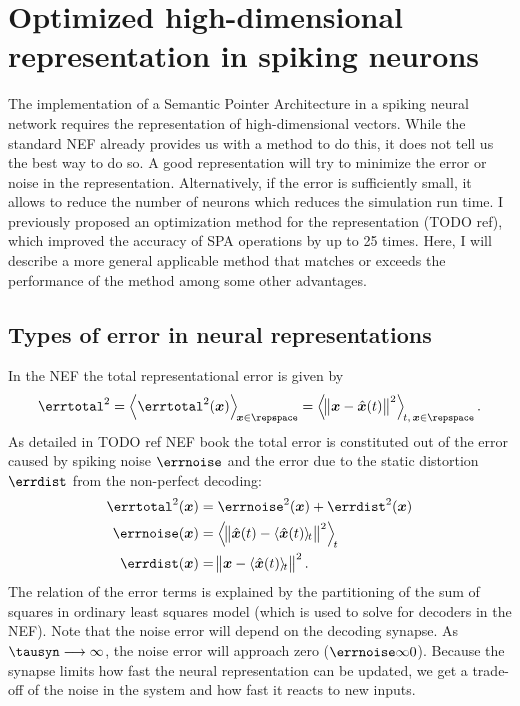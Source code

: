 \chapter{Optimized high-dimensional representation in spiking neurons}
The implementation of a Semantic Pointer Architecture in a spiking neural network requires the representation of high-dimensional vectors.
While the standard NEF already provides us with a method to do this, it does not tell us the best way to do so.
A good representation will try to minimize the error or noise in the representation.
Alternatively, if the error is sufficiently small, it allows to reduce the number of neurons which reduces the simulation run time.
I previously proposed an optimization method for the representation (TODO ref), which improved the accuracy of SPA operations by up to 25 times.
Here, I will describe a more general applicable method that matches or exceeds the performance of the method among some other advantages.

\section{Types of error in neural representations}
In the NEF the total representational error is given by
\begin{equation}
    \errtotal^2 = \left\langle \errtotal^2(\vc x) \right\rangle_{\!\vc x \in \repspace} = \left\langle \norm{\vc x - \hat{\vc x}(t)}^2 \right\rangle_{\!t,\,\vc x \in \repspace} \text{.}
\end{equation}
As detailed in TODO ref NEF book the total error is constituted out of the error caused by spiking noise $\errnoise$ and the error due to the static distortion $\errdist$ from the non-perfect decoding:
\begin{align}
    \errtotal^2(\vc x) &= \errnoise^2(\vc x) + \errdist^2(\vc x) \\
    \errnoise(\vc x) &= \left\langle \norm{\hat{\vc x}(t) - \langle \hat{\vc x}(t) \rangle_{\!t}}^2 \right\rangle_{\!t} \\
    \errdist(\vc x) &= \norm{\vc x - \langle \hat{\vc x}(t) \rangle_{\!t}}^2 \text{.}
\end{align}
The relation of the error terms is explained by the partitioning of the sum of squares in ordinary least squares model (which is used to solve for decoders in the NEF).
Note that the noise error will depend on the decoding synapse.
As $\tausyn \longrightarrow \infty$, the noise error will approach zero ($\errnoise \infty 0$).
Because the synapse limits how fast the neural representation can be updated, we get a trade-off of the noise in the system and how fast it reacts to new inputs.

